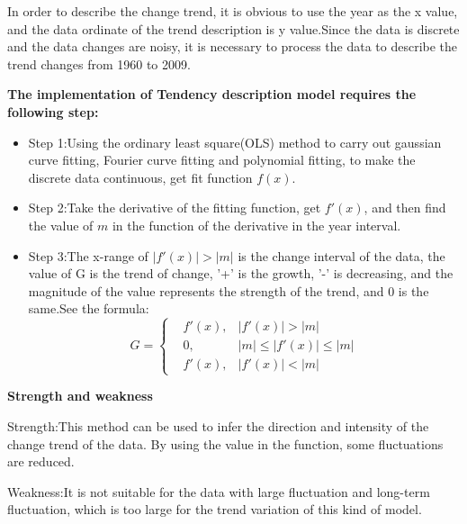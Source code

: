 In order to describe the change trend, it is obvious to use the year as the x value, and the data ordinate of the trend description is y value.Since the data is discrete and the data changes are noisy, it is necessary to process the data to describe the trend changes from 1960 to 2009.

\textbf{The implementation of Tendency description model requires the following step:}
\begin{itemize}
\item Step 1:Using the ordinary least square(OLS) method to carry out gaussian curve fitting, Fourier curve fitting and polynomial fitting, to make the discrete data continuous, get fit function $f(x)$.
\item Step 2:Take the derivative of the fitting function, get $f'(x)$, and then find the value of $m$ in the function of the derivative in the year interval.

\item Step 3:The x-range of $|f'(x)|>|m|$ is the change interval of the data, the value of G is the trend of change, '+' is the growth, '-' is decreasing, and the magnitude of the value represents the strength of the trend, and 0 is the same.See the formula:
 $$ G=\left\{
\begin{aligned}
&f'(x), &|f'(x)|>|m| \\
&0, &|m|\leq|f'(x)|\leq|m| \\
 &f'(x), &|f'(x)|<|m| 
 \end{aligned}
\right.
$$
\end{itemize}

\textbf{Strength and weakness}

Strength:This method can be used to infer the direction and intensity of the change trend of the data. By using the value in the function, some fluctuations are reduced.


Weakness:It is not suitable for the data with large fluctuation and long-term fluctuation, which is too large for the trend variation of this kind of model.

